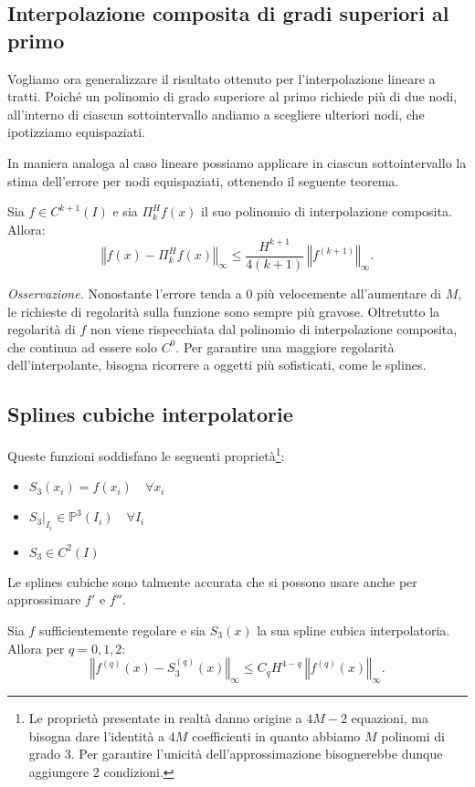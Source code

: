\subsection{Interpolazione composita di gradi superiori al primo}
Vogliamo ora generalizzare il risultato ottenuto per l'interpolazione lineare a tratti.
Poiché un polinomio di grado superiore al primo richiede più di due nodi, all'interno di ciascun sottointervallo andiamo a scegliere ulteriori nodi, che ipotizziamo equispaziati.

In maniera analoga al caso lineare possiamo applicare in ciascun sottointervallo la stima dell'errore per nodi equispaziati, ottenendo il seguente teorema.

\begin{theorem}
Sia $f\in C^{k+1}(I)$ e sia $\Pi ^{H}_{k} f(x)$ il suo polinomio di interpolazione composita. Allora:
\begin{equation*}
\left\Vert f(x) -\Pi ^{H}_{k} f(x)\right\Vert _{\infty } \leqslant \frac{H^{k+1}}{4(k+1)} \ \left\Vert f^{( k+1)}\right\Vert _{\infty }.
\end{equation*}
\end{theorem}
\textit{Osservazione.}
Nonostante l'errore tenda a $0$ più velocemente all'aumentare di $M$, le richieste di regolarità sulla funzione sono sempre più gravose. Oltretutto la regolarità di $f$ non viene rispecchiata dal polinomio di interpolazione composita, che continua ad essere solo $C^0$. Per garantire una maggiore regolarità dell'interpolante, bisogna ricorrere a oggetti più sofisticati, come le splines.

\subsection{Splines cubiche interpolatorie}
Queste funzioni soddisfano le seguenti proprietà\footnote{
Le proprietà presentate in realtà danno origine a $4M-2$ equazioni, ma bisogna dare l'identità a $4 M$ coefficienti in quanto abbiamo $M$ polinomi di grado $3$. Per garantire l'unicità dell'approssimazione bisognerebbe dunque aggiungere 2 condizioni.}:
\begin{itemize}
    \item $S_3(x_i)=f(x_i)\quad \forall x_i$
    \item $S_3|_{I_i}\in \mathbb P^3(I_i)\quad \forall I_ i$
    \item $S_3\in C^2(I)$
\end{itemize}

Le splines cubiche sono talmente accurata che si possono usare anche per approssimare $f'$ e $f''$.
\begin{theorem}
Sia $f$ sufficientemente regolare e sia $S_3(x)$ la sua spline cubica interpolatoria. Allora per $q=0,1,2$:
\begin{equation*}
\left\Vert f^{(q)}(x) -S_3^{(q)}(x)\right\Vert _{\infty } \leqslant C_q H^{4-q} \ \left\Vert f^{(q)}(x)\right\Vert _{\infty }.
\end{equation*}
\end{theorem}


